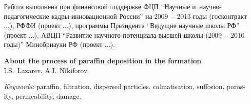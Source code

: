 \documentclass[a4paper,12pt]{article}
\begin{document}
\vspace{2em}
\medskip
Работа выполнена при финансовой поддержке ФЦП ``Научные
и~научно-педагогические кадры инновационной России'' на 2009~--
2013 годы (госконтракт ...), РФФИ (проект ...), программы
Президента ``Ведущие научные школы РФ'' (проект ...), АВЦП
``Развитие научного потенциала высшей школы (2009~-- 2010 годы)''
Минобрнауки РФ (проект ...).



     
   


\begin{otherlanguage}{english}

{\large
\begin{center}
\textbf{About the process of paraffin deposition in the formation}\\
I.S.~Lazarev, A.I.~Nikiforov
\end{center}
}

\begin{abstract}
	This paper considers the problem of two-phase non-isothermal filtration. In the framework of modelling oil is considered as a mixture of two immiscible with water hydrocarbon components "oil" and "paraffin". The ideal solution theory of the binary mixture is applied to predict paraffin crystallisation. Dependences based on the pore size distribution function are used for equations determining the dynamics of porosity and permeability changes. Particular attention is paid to the processes of particle deposition in the porous medium and their disruption from the pore walls. 
\end{abstract}

\textit{Keywords:} paraffin, filtration, dispersed particles, colmatisation, suffosion, porosity, permeability, damage.

\end{otherlanguage}

\end{document}
